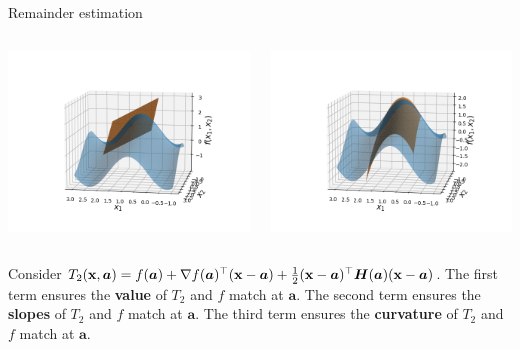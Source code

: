 \begin{vbframe}{Remainder estimation}
\begin{columns}
\begin{column}{0.48\textwidth}
  \includegraphics[width = \textwidth]{figure_man/Taylor2D/Taylor2D_1st100.png}
\end{column}
\begin{column}{0.48\textwidth}
  \includegraphics[width = \textwidth]{figure_man/Taylor2D/Taylor2D_2nd-100.png}
\end{column}
\end{columns}

\begin{footnotesize}
Consider $T_2(\mathbf{x}, \bm{a}) = f(\bm{a}) + \nabla f(\bm{a})^\top (\mathbf{x} - \bm{a}) + \frac{1}{2}(\mathbf{x} - \bm{a})^\top\bm{H}(\bm{a})(\mathbf{x} - \bm{a})$. The first term ensures the \textbf{value} of $T_2$ and $f$ match at $\bm{a}$. The second term ensures the \textbf{slopes} of $T_2$ and $f$ match at $\bm{a}$. The third term ensures the \textbf{curvature} of $T_2$ and $f$ match at $\bm{a}$. 
\end{footnotesize}


\end{vbframe}


